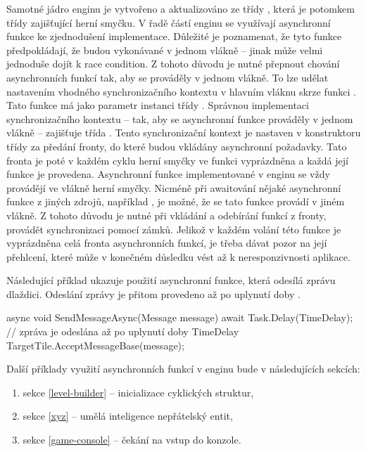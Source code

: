 Samotné jádro enginu je vytvořeno a aktualizováno ze třídy , která je potomkem třídy  zajišťující herní smyčku.
V řadě částí enginu se využívají asynchronní funkce ke zjednodušení implementace. Důležité je 
poznamenat, že tyto funkce předpokládají, že budou vykonávané v jednom vlákně -- jinak může velmi jednoduše dojít k race condition.
Z tohoto důvodu je nutné přepnout chování asynchronních funkcí tak, aby se prováděly v jednom vlákně. To lze udělat nastavením 
vhodného synchronizačního kontextu v hlavním vláknu skrze funkci . 
Tato funkce má jako parametr instanci třídy . Správnou implementaci synchronizačního kontextu 
-- tak, aby se asynchronní funkce prováděly v jednom vlákně -- zajišťuje třída . Tento synchronizační
kontext je nastaven v konstruktoru třídy  za předání fronty, do které budou vkládány asynchronní požadavky.
Tato fronta je poté v každém cyklu herní smyčky ve funkci  vyprázdněna a každá její funkce je provedena.
Asynchronní funkce implementované v enginu se vždy provádějí ve vlákně herní smyčky. Nicméně při awaitování nějaké 
asynchronní funkce z jiných zdrojů, například , je možné, že se tato funkce provádí v jiném vlákně. Z tohoto 
důvodu je nutné při vkládání a odebírání funkcí z fronty, provádět synchronizaci pomocí zámků.
Jelikož v každém volání této funkce je vyprázdněna celá fronta asynchronních funkcí, je třeba dávat pozor na její přehlcení,
které může v konečném důsledku vést až k neresponzivnosti aplikace.

Následující příklad ukazuje použití asynchronní funkce, která odesílá zprávu dlaždici.
Odeslání zprávy je přitom provedeno až po uplynutí doby .

\begin{code}
async void SendMessageAsync(Message message)
{
   await Task.Delay(TimeDelay);  
   // zpráva je odeslána až po uplynutí doby TimeDelay
   TargetTile.AcceptMessageBase(message);
}
\end{code}

Další příklady využití asynchronních funkcí v enginu bude v následujících sekcích:
\begin{enumerate}
\item sekce \vref{level-builder} -- inicializace cyklických struktur,
\item sekce \vref{xyz} -- umělá inteligence nepřátelský entit,
\item sekce \vref{game-console} -- čekání na vstup do konzole. 
\end{enumerate}


